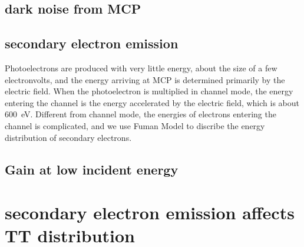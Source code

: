 \documentclass{article}
\begin{document}
\subsection{dark noise from MCP}\label{subsec:dnr}

\subsection{secondary electron emission}\label{subsec:fuman}
Photoelectrons are produced with very little energy, about the size of a few electronvolts, and the energy arriving at MCP is determined primarily by the electric field.
When the photoelectron is multiplied in channel mode, the energy entering the channel is the energy accelerated by the electric field, which is about \SI{600}{eV}. 
Different from channel mode, the energies of electrons entering the channel is complicated, 
and we use Fuman Model to discribe the energy distribution of secondary electrons\cite{2002Probabilistic}. 

\subsection{Gain at low incident energy}\label{sec:gain}



\section{secondary electron emission affects TT distribution}\label{sec:TT}
\newpage


\end{document}

